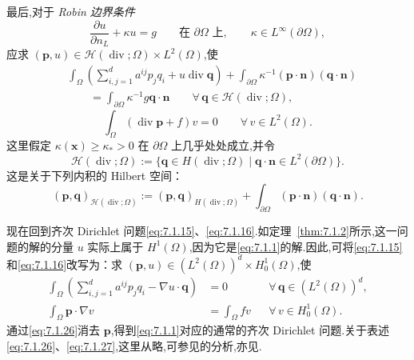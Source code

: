最后,对于 \emph{Robin 边界条件}
\[
  \frac{\partial u}{\partial n_L}+\kappa u=g\qquad\text{在 }\partial\Omega\text{ 上},
    \qquad\kappa\in L^\infty(\partial\Omega),
\]
应求 \((\boldsymbol{p},u)\in\mathcal H(\operatorname{div};\Omega)\times L^2(\Omega)\),使
\begin{equation}\label{eq:7.1.22}
  \begin{aligned}
    &\int_\Omega\left(\sum_{i,j=1}^d a^{ij}p_jq_i+u\operatorname{div}\boldsymbol{q}\right)
       +\int_{\partial\Omega}\kappa^{-1}(\boldsymbol{p}\cdot\boldsymbol{n})(\boldsymbol{q}\cdot\boldsymbol{n})\\
    &\qquad=\int_{\partial\Omega}\kappa^{-1}g\boldsymbol{q}\cdot\boldsymbol{n}
          \qquad\forall\,\boldsymbol{q}\in\mathcal H(\operatorname{div};\Omega),
  \end{aligned}
\end{equation}
\begin{equation}\label{eq:7.1.23}
  \int_\Omega(\operatorname{div}\boldsymbol{p}+f)v=0\qquad\forall\,v\in L^2(\Omega).
\end{equation}
这里假定 \(\kappa(\boldsymbol{x})\ge\kappa_*>0\) 在 \(\partial\Omega\) 上几乎处处成立,并令
\begin{equation}\label{eq:7.1.24}
  \mathcal H(\operatorname{div};\Omega):=
    \{\boldsymbol{q}\in H(\operatorname{div};\Omega)\mid
        \boldsymbol{q}\cdot\boldsymbol{n}\in L^2(\partial\Omega)\}.
\end{equation}
这是关于下列内积的 Hilbert 空间：
\begin{equation}\label{eq:7.1.25}
  (\boldsymbol{p},\boldsymbol{q})_{\mathcal H(\operatorname{div};\Omega)}
     :=(\boldsymbol{p},\boldsymbol{q})_{H(\operatorname{div};\Omega)}
        +\int_{\partial\Omega}(\boldsymbol{p}\cdot\boldsymbol{n})(\boldsymbol{q}\cdot\boldsymbol{n}).
\end{equation}

现在回到齐次 Dirichlet 问题\eqref{eq:7.1.15}、\eqref{eq:7.1.16}.如定理~\ref{thm:7.1.2}所示,这一问题的解的分量 \(u\) 实际上属于 \(H^1(\Omega)\),因为它是\eqref{eq:7.1.1}的解.因此,可将\eqref{eq:7.1.15}和\eqref{eq:7.1.16}改写为：求 \((\boldsymbol{p},u)\in(L^2(\Omega))^d\times H_0^1(\Omega)\),使
\begin{align}
  \int_\Omega\left(\sum_{i,j=1}^d a^{ij}p_jq_i-\nabla u\cdot\boldsymbol{q}\right)
      &=0 &&\forall\,\boldsymbol{q}\in(L^2(\Omega))^d,\label{eq:7.1.26}\\
  \int_\Omega\boldsymbol{p}\cdot\nabla v
      &=\int_\Omega fv &&\forall\,v\in H_0^1(\Omega).\label{eq:7.1.27}
\end{align}
通过\eqref{eq:7.1.26}消去 \(\boldsymbol{p}\),得到\eqref{eq:7.1.1}对应的通常的齐次 Dirichlet 问题.关于表述\eqref{eq:7.1.26}、\eqref{eq:7.1.27},这里从略,可参见的分析,亦见.

